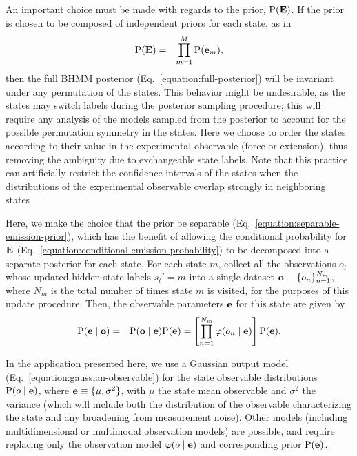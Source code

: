 \documentclass[aps,pre,twocolumn,superscriptaddress,nofootinbib,longbibliography]{revtex4-1}
\newcommand{\bfm}[1]{{\bf #1}}
\renewcommand{\Pr}{\mathrm{P}}
\begin{document}
{An important choice must be made with regards to the prior, $\Pr(\bfm{E})$.
If the prior is chosen to be composed of independent priors for each state, as in
\begin{eqnarray}
\Pr(\bfm{E}) &=& \prod_{m=1}^M \Pr(\bfm{e}_m) \label{equation:separable-emission-prior} ,
\end{eqnarray}
then the full BHMM posterior (Eq.~\ref{equation:full-posterior}) will be invariant under any permutation of the states.
This behavior might be undesirable, as the states may switch labels during the posterior sampling procedure; this will require any analysis of the models sampled from the posterior to account for the possible permutation symmetry in the states.
{\color{magenta}Here we choose to order the states according to their value in the experimental observable (force or extension), thus removing
the ambiguity due to exchangeable state labels. Note that this practice can artificially restrict the confidence intervals of the states when 
the distributions of the experimental observable overlap strongly in neighboring states}


Here, we make the choice that the prior be separable (Eq.~\ref{equation:separable-emission-prior}), which has the benefit of allowing the conditional probability for $\bfm{E}$ (Eq.~\ref{equation:conditional-emission-probability}) to be decomposed into a separate posterior for each state.
For each state $m$, collect all the observations $o^{}_{t}$ whose updated hidden state labels ${s^{}_{t}}' = m$ into a single dataset $\bfm{o} \equiv \{o_n\}_{n=1}^{N_m}$, where $N_m$ is the total number of times state $m$ is visited, for the purposes of this update procedure.
Then, the observable parameters $\bfm{e}$ for this state are given by
\begin{eqnarray}
\Pr(\bfm{e} \mid \bfm{o}) &=& \Pr(\bfm{o} \mid \bfm{e}) \Pr(\bfm{e}) = \left[ \prod_{n=1}^{N_m} \varphi(o_n \mid \bfm{e}) \right] \Pr(\bfm{e}) .
\end{eqnarray}

In the application presented here, we use a Gaussian output model (Eq.~\ref{equation:gaussian-observable}) 
for the state observable distributions $\Pr(o \mid \bfm{e})$, where $\bfm{e} \equiv \{\mu, \sigma^2\}$, with $\mu$ the state mean observable and $\sigma^2$ the variance (which will include both the distribution of the observable characterizing the state and any broadening from measurement noise).
Other models (including multidimensional or multimodal observation models) are possible, and require replacing only the observation model $\varphi(o \mid \bfm{e})$ and corresponding prior $\Pr(\bfm{e})$.

}
\end{document}

